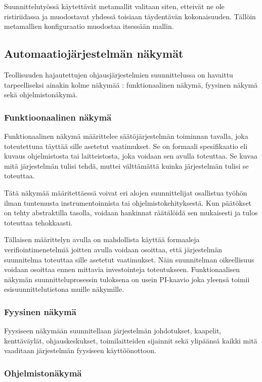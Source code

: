 \documentclass[finnish,12pt]{article}
\begin{document}
Suunnittelutyössä käytettävät metamallit valitaan siten, etteivät ne ole
ristiriidassa ja muodostavat yhdessä toisiaan täydentävän kokonaisuuden.
Tällöin metamallien konfiguraatio muodostaa itsessään mallin.


	\subsection{Automaatiojärjestelmän näkymät}

Teollisuuden hajautettujen ohjausjärjestelmien suunnittelussa on havaittu
tarpeelliseksi ainakin kolme näkymää \cite{RefWorks:38}: funktionaalinen näkymä,
fyysinen näkymä sekä ohjelmistonäkymä.

		\subsubsection{Funktioonaalinen näkymä}
Funktionaalinen näkymä määrittelee säätöjärjestelmän toiminnan tavalla, joka toteutettuna täyttää sille asetetut vaatimukset. Se on formaali spesifikaatio eli kuvaus ohjelmistosta tai laitteistosta, joka voidaan sen avulla toteuttaa. Se kuvaa mitä järjestelmän tulisi tehdä, muttei välttämättä kuinka järjestelmän tulisi se toteuttaa.

Tätä näkymää määritettäessä voivat eri alojen suunnittelijat osallistua työhön ilman
tuntemusta instrumentoinnista tai ohjelmistokehityksestä. Kun päätökset on tehty
abstraktilla tasolla, voidaan hankinnat räätälöidä sen mukaisesti ja tulos
toteuttaa tehokkaasti.

Tällaisen määrittelyn avulla on mahdollista käyttää formaaleja verifiointimenetelmiä joitten avulla
voidaan osoittaa, että järjestelmän suunnitelma toteuttaa sille asetetut vaatimukset.
Näin suunnitelman oikeellisuus voidaan osoittaa ennen mittavia investointeja toteutukseen.
Funktionaalisen näkymän suunnitteluprosessin tuloksena on usein
PI-kaavio joka yleensä toimii esisuunnittelutietona muille näkymille.

		\subsubsection{Fyysinen näkymä}
Fyysiseen näkymään suunnitellaan järjestelmän johdotukset, kaapelit, kenttäväylät,
ohjauskeskukset, toimilaitteiden sijainnit sekä ylipäänsä kaikki mitä vaaditaan 
järjestelmän fyysiseen käyttöönottoon.


		\subsubsection{Ohjelmistonäkymä}
\end{document}
